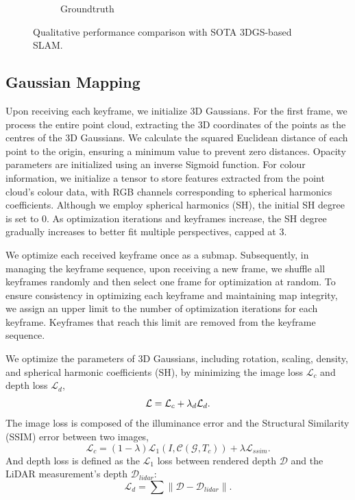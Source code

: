 \documentclass[lettersize,journal]{IEEEtran}
\begin{document}
\begin{figure}[ht]
\begin{subfigure}{0.23\textwidth}
        \caption{Groundtruth}
        \label{fig:qualitativecomparisongroundtruth}
    \end{subfigure}
    \caption{Qualitative performance comparison with SOTA 3DGS-based SLAM.}
    \label{fig:qualitativecomparison}
\end{figure}


\subsection{Gaussian Mapping}
Upon receiving each keyframe, we initialize 3D Gaussians. For the first frame, we process the entire point cloud, extracting the 3D coordinates of the points as the centres of the 3D Gaussians. We calculate the squared Euclidean distance of each point to the origin, ensuring a minimum value to prevent zero distances. Opacity parameters are initialized using an inverse Sigmoid function. For colour information, we initialize a tensor to store features extracted from the point cloud's colour data, with RGB channels corresponding to spherical harmonics coefficients. Although we employ spherical harmonics (SH), the initial SH degree is set to 0. As optimization iterations and keyframes increase, the SH degree gradually increases to better fit multiple perspectives, capped at 3.

We optimize each received keyframe once as a submap. Subsequently, in managing the keyframe sequence, upon receiving a new frame, we shuffle all keyframes randomly and then select one frame for optimization at random. To ensure consistency in optimizing each keyframe and maintaining map integrity, we assign an upper limit to the number of optimization iterations for each keyframe. Keyframes that reach this limit are removed from the keyframe sequence.

We optimize the parameters of 3D Gaussians, including rotation, scaling, density, and spherical harmonic coefficients (SH), by minimizing the image loss $\mathcal{L}_c$ and depth loss $\mathcal{L}_d$,
\begin{equation}
\mathcal{L}={\mathcal{L}_c} + {{\lambda}_d}{\mathcal{L}_d}.
\label{eq:mathcal{L}}
\end{equation}
The image loss is composed of the illuminance error and the Structural Similarity (SSIM) error between two images,
\begin{equation}
\mathcal{L}_c=(1-\lambda){\mathcal{L}_1}(I,\mathcal{C}(\mathcal{G},{T_c})) + \lambda{\mathcal{L}_{ssim}}.
\label{eq:mathcalLc}
\end{equation}
And depth loss is defined as the $\mathcal{L}_1$ loss between rendered depth $\mathcal{D}$ and the LiDAR measurement’s depth $\mathcal{D}_{lidar}$:
\begin{equation}
\mathcal{L}_d = \sum \left\lVert \mathcal{D} - \mathcal{D}_{lidar} \right\rVert .
\label{eq:mathcalLd}
\end{equation}
\end{document}

